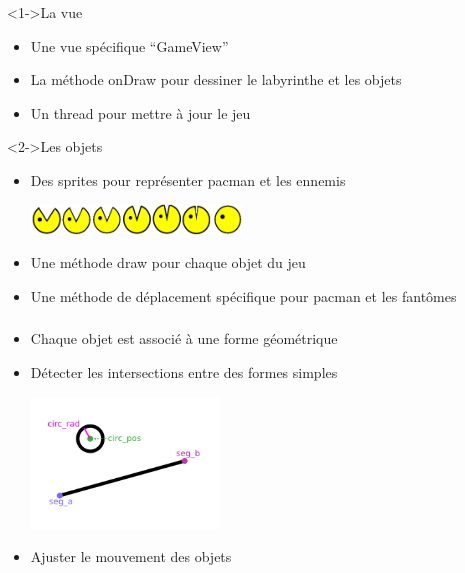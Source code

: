 \documentclass[handout]{beamer}
\begin{document}
\begin{frame}
  \frametitle<1->{}
  \begin{block}<1->{La vue}
    \begin{itemize}
    \item <1->{Une vue spécifique \enquote{GameView} }
    \item <2->{La méthode onDraw pour dessiner le labyrinthe et les objets}
    \item <3->{Un thread pour mettre à jour le jeu}
    \end{itemize}
  \end{block}
  \begin{block}<2->{Les objets}
    \begin{itemize}
    \item <4->{Des sprites pour représenter pacman et les ennemis}
    \begin{center}
      \includegraphics[height=8mm]{pacman_sprites.png}
    \end{center}
    \item <5->{Une méthode draw pour chaque objet du jeu}%
    \item <6->{Une méthode de déplacement spécifique pour pacman et les fantômes}
    \end{itemize}
  \end{block}
\end{frame}

\begin{frame}
  \frametitle<1->{}
    \begin{itemize}
    \item <1->{Chaque objet est associé à une forme géométrique}
    \item <2->{Détecter les intersections entre des formes simples}
    \begin{center}
      \includegraphics[height=35mm]{circle_intersect.png}
    \end{center}
    \item <3->{Ajuster le mouvement des objets}
    \end{itemize}
\end{frame}
\end{document}
